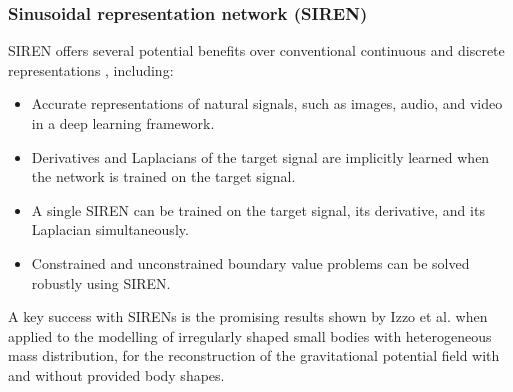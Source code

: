 \subsubsection{Sinusoidal representation network (SIREN)}\label{ssec:siren}

\gls{SIREN} offers several potential benefits over conventional continuous and discrete representations \cite{Sitzmann2020}, including:

\begin{itemize}
    \item Accurate representations of natural signals, such as images, audio, and video in a deep learning framework.
    \item Derivatives and Laplacians of the target signal are implicitly learned when the network is trained on the target signal.
    \item A single \gls{SIREN} can be trained on the target signal, its derivative, and its Laplacian simultaneously.
    \item Constrained and unconstrained boundary value problems can be solved robustly using \gls{SIREN}. 
\end{itemize}

A key success with \glspl{SIREN} is the promising results shown by Izzo et al. \cite{IzzoGeodesyNet2021, IzzoBennu2021} when applied to the modelling of irregularly shaped small bodies with heterogeneous mass distribution, for the reconstruction of the gravitational potential field with and without provided body shapes.




